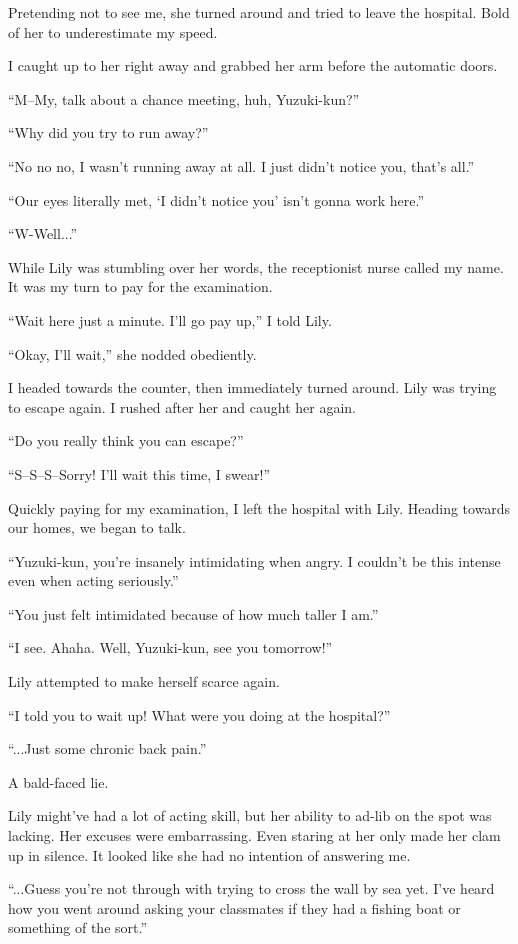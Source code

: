 Pretending not to see me, she turned around and tried to leave the hospital. Bold of her to underestimate my speed.

I caught up to her right away and grabbed her arm before the automatic doors.

``M--My, talk about a chance meeting, huh, Yuzuki-kun?''

``Why did you try to run away?''

``No no no, I wasn't running away at all. I just didn't notice you, that's all.''

``Our eyes literally met, `I didn't notice you' isn't gonna work here.''

``W-Well...''

While Lily was stumbling over her words, the receptionist nurse called my name. It was my turn to pay for the examination.

``Wait here just a minute. I'll go pay up,'' I told Lily.

``Okay, I'll wait,'' she nodded obediently.

I headed towards the counter, then immediately turned around. Lily was trying to escape again. I rushed after her and caught her again.

``Do you really think you can escape?''

``S--S--S--Sorry! I'll wait this time, I swear!''

Quickly paying for my examination, I left the hospital with Lily. Heading towards our homes, we began to talk.

``Yuzuki-kun, you're insanely intimidating when angry. I couldn't be this intense even when acting seriously.''

``You just felt intimidated because of how much taller I am.''

``I see. Ahaha. Well, Yuzuki-kun, see you tomorrow!''

Lily attempted to make herself scarce again.

``I told you to wait up! What were you doing at the hospital?''

``...Just some chronic back pain.''

A bald-faced lie.

Lily might've had a lot of acting skill, but her ability to ad-lib on the spot was lacking. Her excuses were embarrassing. Even staring at her only made her clam up in silence. It looked like she had no intention of answering me.

``...Guess you're not through with trying to cross the wall by sea yet. I've heard how you went around asking your classmates if they had a fishing boat or something of the sort.''

